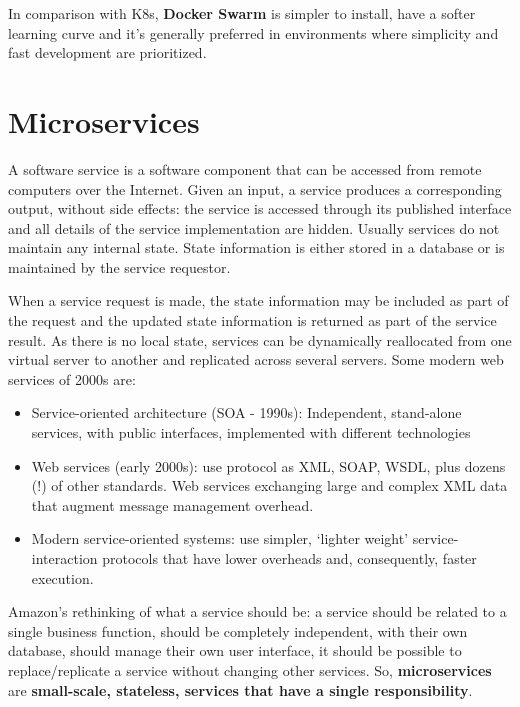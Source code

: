 \documentclass[10pt,a4paper]{report}
\begin{document}
In comparison with K8s, \textbf{Docker Swarm} is simpler to install, have a softer learning curve and it's generally preferred in environments where simplicity and fast development are prioritized.



\chapter{Microservices}

A software service is a software component that can be accessed from remote computers over the Internet. Given an input, a service produces a corresponding output, without side effects: the service is accessed through its published interface and all details of the service implementation are hidden. Usually services do not maintain any internal state. State information is either stored in a database or is maintained by the service requestor.

When a service request is made, the state information may be included as part of the request and the updated state information is returned as part of the service result. As there is no local state, services can be dynamically reallocated from one virtual server to another and replicated across several servers.
Some modern web services of 2000s are:
\begin{itemize}
	\item Service-oriented architecture (SOA - 1990s): Independent, stand-alone services, with public interfaces, implemented with different technologies
	\item Web services (early 2000s): use protocol as XML, SOAP, WSDL, plus dozens (!) of other standards. Web services exchanging large and complex XML data that augment message management overhead. 
	\item Modern service-oriented systems: use simpler, ‘lighter weight’ service-interaction protocols that have lower overheads and,	consequently, faster execution.
\end{itemize}

Amazon’s rethinking of what a service should be: a service should be related to a single business function, should be completely independent, with their own database, should manage their own user interface, it should be possible to replace/replicate a service without changing other services.
So, \textbf{microservices} are \textbf{small-scale, stateless, services that have a single responsibility}.
\end{document}
